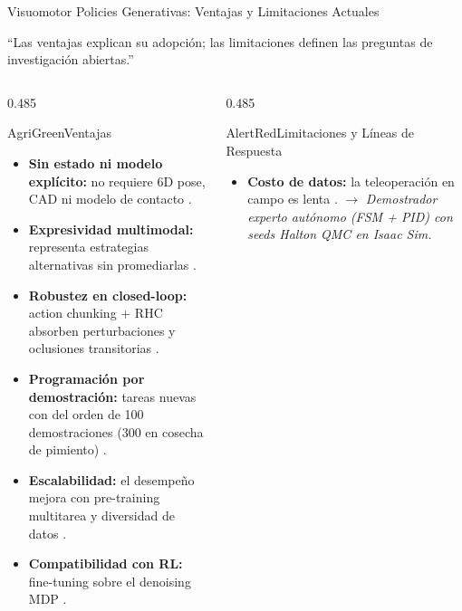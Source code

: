 \documentclass[aspectratio=169,10pt,xcolor={dvipsnames,table}]{beamer}
\newcommand{\BannerFont}{\fontsize{7.5}{9.2}\selectfont\bfseries}       %
\newcommand{\BannerArc}{1.5pt}             %
\newcommand{\BannerRule}{0.5pt}            %
\newcommand{\BannerLeftRule}{2.5pt}        %
\newcommand{\CardHeightDouble}{42.5mm}     %
\newcommand{\BannerCentral}[2][UCNCyan]{%
  \begin{tcolorbox}[
    enhanced,
    colback=#1!10,
    colframe=#1,
    boxrule=\BannerRule,
    leftrule=\BannerLeftRule,
    arc=\BannerArc,
    top=0.35mm, bottom=0.35mm, left=2mm, right=2mm
  ]
    {\BannerFont\raggedright\textcolor{UCNBlue}{#2}\par}
  \end{tcolorbox}%
  \vspace{-2.5mm}%
}
\newcommand{\CheckMark}{\textcolor{AgriGreen}{$\checkmark$}}
\newcommand{\CrossMark}{\textcolor{AlertRed}{$\times$}}
\begin{document}
\begin{frame}{Visuomotor Policies Generativas: Ventajas y Limitaciones Actuales}
  \BannerCentral[GoldGORE]{``Las ventajas explican su adopción; las limitaciones definen las preguntas de investigación abiertas.''}
  \vspace{0.8mm}
  \begin{columns}[T, onlytextwidth]
    \begin{column}{0.485\textwidth}
      \begin{Card}[height=\CardHeightDouble]{AgriGreen}{Ventajas}
        {\fontsize{5.4}{6.5}\selectfont
        \begin{itemize}\setlength{\itemsep}{1.2pt}
          \item[\CheckMark] \textbf{Sin estado ni modelo explícito:} no requiere 6D pose, CAD ni modelo de contacto \cite{levine2016end}.
          \item[\CheckMark] \textbf{Expresividad multimodal:} representa estrategias alternativas sin promediarlas \cite{chi2025diffusion}.
          \item[\CheckMark] \textbf{Robustez en closed-loop:} action chunking + RHC absorben perturbaciones y oclusiones transitorias \cite{zhao2023act}.
          \item[\CheckMark] \textbf{Programación por demostración:} tareas nuevas con del orden de 100 demostraciones (300 en cosecha de pimiento) \cite{kim2025pepper}.
          \item[\CheckMark] \textbf{Escalabilidad:} el desempeño mejora con pre-training multitarea y diversidad de datos \cite{oxe2024openx,xiao2025foundation}.
          \item[\CheckMark] \textbf{Compatibilidad con RL:} fine-tuning sobre el denoising MDP \cite{ren2025dppo}.
        \end{itemize}}
      \end{Card}
    \end{column}
    \begin{column}{0.485\textwidth}
      \begin{Card}[height=\CardHeightDouble]{AlertRed}{Limitaciones y Líneas de Respuesta}
        {\fontsize{5.4}{6.5}\selectfont
        \begin{itemize}\setlength{\itemsep}{1.2pt}
          \item[\CrossMark] \textbf{Costo de datos:} la teleoperación en campo es lenta \cite{hou2025sroi,xue2025demogen}. $\to$ \textcolor{AgriGreenDark}{\textit{Demostrador experto autónomo (FSM + PID) con seeds Halton QMC en Isaac Sim.}}

\end{itemize}}
\end{Card}
\end{column}
\end{columns}
\end{frame}
\end{document}
